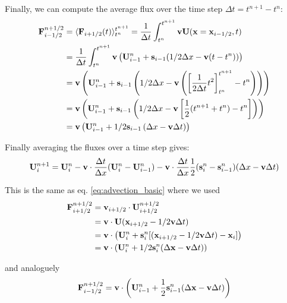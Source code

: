 Finally, we can compute the average flux over the time step $\Delta t = t^{n+1} - t^{n}$:
\begin{align}
	\mathbf{F}_{i-1/2}^{n+1/2} 
	&= \langle \mathbf{F}_{i+1/2}(t)\rangle _{t^n} ^ {t^{n+1}} 
	= \frac{1}{\Delta t} \int_{t^n}^{t^{n+1}} \mathbf{v} \mathbf{U}(\mathbf{x} 
	= \mathbf{x}_{i-1/2}, t) \\
	&= \frac{1}{\Delta t} \int_{t^n}^{t^{n+1}} \mathbf{v} \left( \mathbf{U}_{i-1}^n + \mathbf{s}_{i-1} (1/2 \Delta x - \mathbf{v} (t - t^n)) \right) \\
	&= \mathbf{v} \left( \mathbf{U}_{i-1}^n  + \mathbf{s}_{i-1} \left( 1/2 \Delta x - \mathbf{v} \left( \left[ \frac{1}{2 \Delta t} t^2 \right]_{t^n}^{t^{n+1}} - t^n \right)  \right) \right) \\
	&= \mathbf{v} \left( \mathbf{U}_{i-1}^n  + \mathbf{s}_{i-1} \left( 1/2 \Delta x - \mathbf{v} \left[ \frac{1}{2} (t^{n+1} + t^n) - t^n \right] \right) \right) \\
	&= \mathbf{v} \left( \mathbf{U}_{i-1}^n  + 1/2 \mathbf{s}_{i-1} \left(\Delta x - \mathbf{v} \Delta t \right) \right)
\end{align}



Finally averaging the fluxes over a time step gives:
\begin{equation}
	\mathbf{U}_i^{n+1} = \mathbf{U}_i^n - \mathbf{v} \cdot \frac{\Delta t}{\Delta x} ( \mathbf{U}_i ^n - \mathbf{U}_{i-1}^n) - \mathbf{v} \cdot \frac{\Delta t}{\Delta x} \frac{1}{2} (\mathbf{s}_i^n - \mathbf{s}_{i-1}^n)(\Delta x - \mathbf{v} \Delta t)
\end{equation}

This is the same as eq. \ref{eq:advection_basic} where we used
\begin{align*}
	\mathbf{F}_{i + 1/2}^{n+1/2} 
		& = \mathbf{v}_{i+1/2} \cdot  \mathbf{U}_{i+1/2} ^{n + 1/2} \\
		& = \mathbf{v} \cdot \mathbf{U}(\mathbf{x}_{i+1/2} - 1/2 \mathbf{v} \Delta t) \\
		& = \mathbf{v} \cdot \left( \mathbf{U}_i^n + \mathbf{s}_i^n [(\mathbf{x}_{i+1/2} - 1/2 \mathbf{v} \Delta t) - \mathbf{x}_i ]  \right)\\
		& = \mathbf{v} \cdot \left( \mathbf{U}_i^n + 1/2 \mathbf{s}_i^n (\Delta \mathbf{x} -  \mathbf{v} \Delta t)  \right)\\
\end{align*}

and analoguely
\begin{align*}
	\mathbf{F}_{i - 1/2}^{n+1/2} 
		& = \mathbf{v} \cdot \left( \mathbf{U}_{i-1}^n + \frac{1}{2} \mathbf{s}_{i-1}^n (\Delta \mathbf{x} -  \mathbf{v} \Delta t)  \right)\\
\end{align*}








